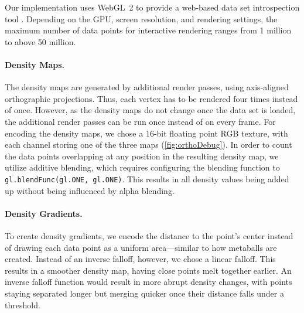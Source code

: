 \documentclass[sigconf]{acmart}
\begin{document}
Our implementation uses WebGL~2 to provide a web-based data set introspection tool \cite{scatterplot}.
Depending on the GPU, screen resolution, and rendering settings, the maximum number of data points for interactive rendering ranges from 1 million to above 50 million.

\paragraph{Density Maps.}
The density maps are generated by additional render passes, using axis-aligned orthographic projections.
Thus, each vertex has to be rendered four times instead of once.
However, as the density maps do not change once the data set is loaded, the additional render passes can be run once instead of on every frame.
For encoding the density maps, we chose a 16-bit floating point RGB texture, with each channel storing one of the three maps (\autoref{fig:orthoDebug}).
In order to count the data points overlapping at any position in the resulting density map, we utilize additive blending, which requires configuring the blending function to {\small\texttt{gl.blendFunc(gl.ONE, gl.ONE)}}.
This results in all density values being added up without being influenced by alpha blending.

\paragraph{Density Gradients.}
To create density gradients, we encode the distance to the point's center instead of drawing each data point as a uniform area---similar to how metaballs are created.
Instead of an inverse falloff, however, we chose a linear falloff.
This results in a smoother density map, having close points melt together earlier.
An inverse falloff function would result in more abrupt density changes, with points staying separated longer but merging quicker once their distance falls under a threshold.
\end{document}
